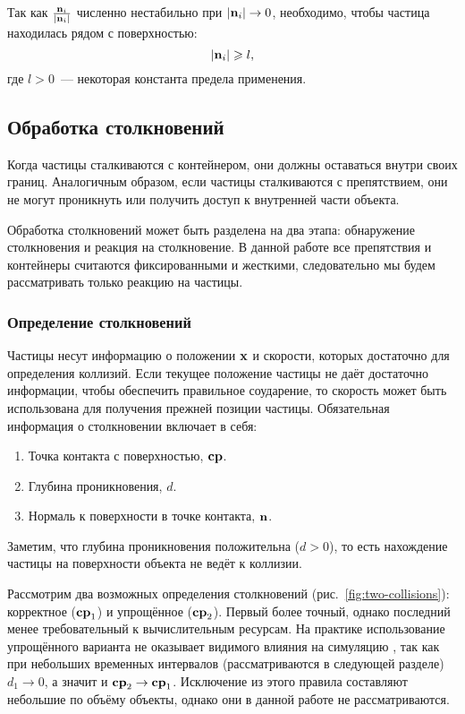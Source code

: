 Так как $\frac{\boldsymbol{\mathbf{n}}_i}{|\boldsymbol{\mathbf{n}}_i|}$ численно нестабильно при $|\boldsymbol{\mathbf{n}}_i|\to 0$, необходимо, чтобы частица находилась рядом с поверхностью:
\begin{equation} \label{eq:is-surface}
  |\boldsymbol{\mathbf{n}}_i|\geqslant l,
\end{equation}
где $l>0$~--- некоторая константа предела применения.


\subsection{Обработка столкновений}
Когда частицы сталкиваются с контейнером, они должны оставаться внутри своих границ. Аналогичным образом, если частицы сталкиваются с препятствием, они не могут проникнуть или получить доступ к внутренней части объекта.

Обработка столкновений может быть разделена на два этапа: обнаружение столкновения и реакция на столкновение. В данной работе все препятствия и контейнеры считаются фиксированными и жесткими, следовательно мы будем рассматривать только реакцию на частицы.


\subsubsection{Определение столкновений}
Частицы несут информацию о положении $\boldsymbol{\mathbf{x}}$ и скорости, которых достаточно для определения коллизий. Если текущее положение частицы не даёт достаточно информации, чтобы обеспечить правильное соударение, то скорость может быть использована для получения прежней позиции частицы. Обязательная информация о столкновении включает в себя:
\begin{enumerate}
  \item Точка контакта с поверхностью, $\boldsymbol{\mathbf{cp}}$.
  \item Глубина проникновения, $d$.
  \item Нормаль к поверхности в точке контакта, $\boldsymbol{\mathbf{n}}$.
\end{enumerate}

Заметим, что глубина проникновения положительна ($d>0$), то есть нахождение частицы на поверхности объекта не ведёт к  коллизии.

Рассмотрим два возможных определения столкновений (рис.~\ref{fig:two-collisions}): корректное ($\boldsymbol{\mathbf{cp}}_1$) и упрощённое ($\boldsymbol{\mathbf{cp}}_2$). Первый более точный, однако последний менее требовательный к вычислительным ресурсам. На практике использование упрощённого варианта не оказывает видимого влияния на симуляцию \cite{kelager}, так как при небольших временных интервалов (рассматриваются в следующей разделе) $d_1\to 0$, а значит и $\boldsymbol{\mathbf{cp}}_2\to\boldsymbol{\mathbf{cp}}_1$. Исключение из этого правила составляют небольшие по объёму объекты, однако они в данной работе не рассматриваются.

